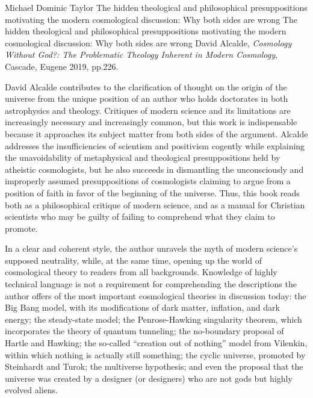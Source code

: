 \begin{recengenv}{Michael Dominic Taylor}
	{The hidden theological and philosophical presuppositions motivating the modern cosmological discussion: Why both sides are wrong}
	{The hidden theological and philosophical presuppositions motivating the modern cosmological discussion: Why both sides are wrong}
	{David Alcalde, \textit{Cosmology Without God?: The Problematic Theology Inherent in Modern Cosmology}, Cascade, Eugene 2019, pp.226.}





David Alcalde contributes to the clarification of thought on the origin of the universe from the unique position of an author who holds doctorates in both astrophysics and theology. Critiques of modern science and its limitations are increasingly necessary and increasingly common, but this work is indispensable because it approaches its subject matter from both sides of the argument. Alcalde addresses the insufficiencies of scientism and positivism cogently while explaining the unavoidability of metaphysical and theological presuppositions held by atheistic cosmologists, but he also succeeds in dismantling the unconsciously and improperly assumed presuppositions of cosmologists claiming to argue from a position of faith in favor of the beginning of the universe. Thus, this book reads both as a philosophical critique of modern science, and as a manual for Christian scientists who may be guilty of failing to comprehend what they claim to promote.

In a clear and coherent style, the author unravels the myth of modern science's supposed neutrality, while, at the same time, opening up the world of cosmological theory to readers from all backgrounds. Knowledge of highly technical language is not a requirement for comprehending the descriptions the author offers of the most important cosmological theories in discussion today: the Big Bang model, with its modifications of dark matter, inflation, and dark energy; the steady-state model; the Penrose-Hawking singularity theorem, which incorporates the theory of quantum tunneling; the no-boundary proposal of Hartle and Hawking; the so-called ``creation out of nothing'' model from Vilenkin, within which nothing is actually still something; the cyclic universe, promoted by Steinhardt and Turok; the multiverse hypothesis; and even the proposal that the universe was created by a designer (or designers) who are not gods but highly evolved aliens.


\end{recengenv}
